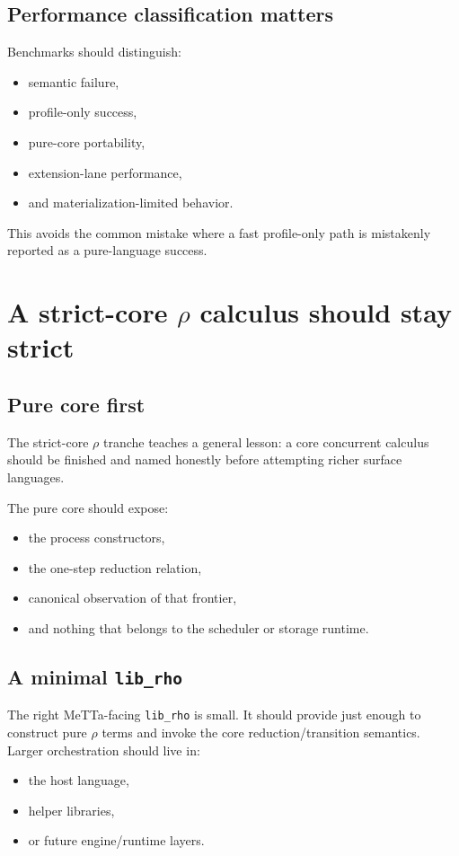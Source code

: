 \documentclass[11pt]{article}
\begin{document}
\subsection{Performance classification matters}

Benchmarks should distinguish:
\begin{itemize}
    \item semantic failure,
    \item profile-only success,
    \item pure-core portability,
    \item extension-lane performance,
    \item and materialization-limited behavior.
\end{itemize}

This avoids the common mistake where a fast profile-only path is mistakenly reported as a pure-language success.

\section{A strict-core \texorpdfstring{$\rho$}{rho} calculus should stay strict}

\subsection{Pure core first}

The strict-core $\rho$ tranche teaches a general lesson: a core concurrent calculus should be finished and named honestly before attempting richer surface languages.

The pure core should expose:
\begin{itemize}
    \item the process constructors,
    \item the one-step reduction relation,
    \item canonical observation of that frontier,
    \item and nothing that belongs to the scheduler or storage runtime.
\end{itemize}

\subsection{A minimal \texttt{lib\_rho}}

The right MeTTa-facing \texttt{lib\_rho} is small. It should provide just enough to construct pure $\rho$ terms and invoke the core reduction/transition semantics. Larger orchestration should live in:
\begin{itemize}
    \item the host language,
    \item helper libraries,
    \item or future engine/runtime layers.
\end{itemize}
\end{document}
